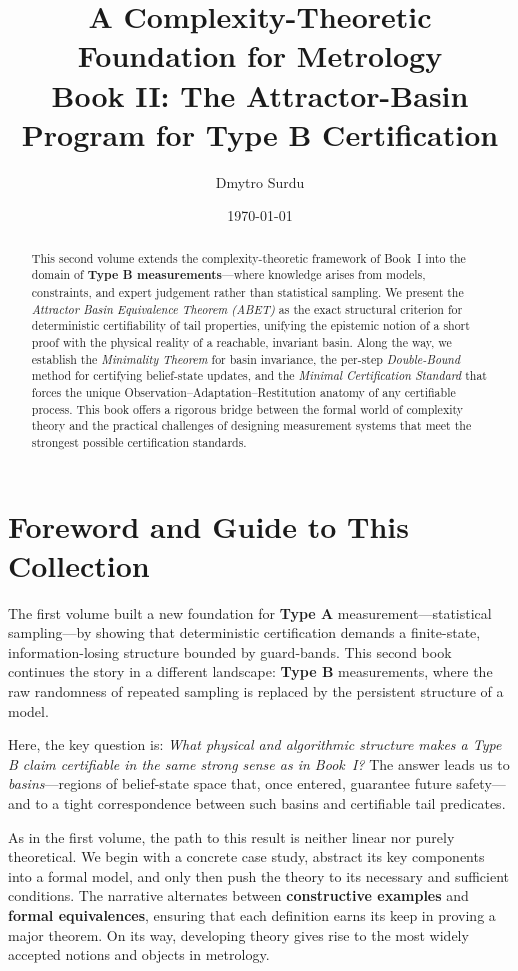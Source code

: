 \documentclass[12pt]{article}
\title{\textbf{A Complexity-Theoretic Foundation for Metrology \\ \large Book II: The Attractor-Basin Program for Type B Certification}}
\author{Dmytro Surdu}
\date{\today}
\begin{document}
\maketitle

\begin{abstract}
\noindent
This second volume extends the complexity-theoretic framework of Book~I into the domain of \textbf{Type B measurements}—where knowledge arises from models, constraints, and expert judgement rather than statistical sampling. We present the \emph{Attractor Basin Equivalence Theorem (ABET)} as the exact structural criterion for deterministic certifiability of tail properties, unifying the epistemic notion of a short proof with the physical reality of a reachable, invariant basin. Along the way, we establish the \emph{Minimality Theorem} for basin invariance, the per-step \emph{Double-Bound} method for certifying belief-state updates, and the \emph{Minimal Certification Standard} that forces the unique Observation--Adaptation--Restitution anatomy of any certifiable process. This book offers a rigorous bridge between the formal world of complexity theory and the practical challenges of designing measurement systems that meet the strongest possible certification standards.
\end{abstract}

\section*{Foreword and Guide to This Collection}

The first volume built a new foundation for \textbf{Type A} measurement---statistical sampling---by showing that deterministic certification demands a finite-state, information-losing structure bounded by guard-bands. This second book continues the story in a different landscape: \textbf{Type B} measurements, where the raw randomness of repeated sampling is replaced by the persistent structure of a model.

Here, the key question is: \emph{What physical and algorithmic structure makes a Type B claim certifiable in the same strong sense as in Book~I?} The answer leads us to \emph{basins}---regions of belief-state space that, once entered, guarantee future safety---and to a tight correspondence between such basins and certifiable tail predicates.

As in the first volume, the path to this result is neither linear nor purely theoretical. We begin with a concrete case study, abstract its key components into a formal model, and only then push the theory to its necessary and sufficient conditions. The narrative alternates between \textbf{constructive examples} and \textbf{formal equivalences}, ensuring that each definition earns its keep in proving a major theorem. On its way, developing theory gives rise to the most widely accepted notions and objects in metrology.
\end{document}
